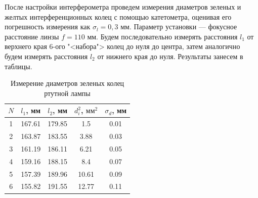 \documentclass[a4paper, 12pt]{article}%
\begin{document}
\item После настройки интерферометра проведем измерения диаметров зеленых и желтых интерференционных колец с помощью катетометра, оценивая его погрешность измерения как $ \sigma_l = 0,3 $ мм. Параметр установки --- фокусное расстояние линзы $ f = 110 $ мм. Будем последовательно измерять расстояния $ l_1 $ от верхнего края 6-ого "<набора"> колец до нуля до центра, затем аналогично будем измерять расстояния $ l_2 $ от нижнего края до нуля. Результаты занесем в таблицы. 

			\begin{table}[h!]
			\caption{Измерение диаметров зеленых колец ртутной лампы}
			\begin{center}
				\begin{tabular}{|c|c|c|c|c|}
					\hline
					$ N $ & $ l_1 $, мм & $ l_2 $, мм & $ d_i^2 $, $ мм^2 $ & $ \sigma_d $, мм\\
					\hline
					 1 & 167.61 & 179.85 & 1.5 & 0.01 \\
					2 & 163.87 & 183.55 & 3.88 & 0.03 \\
					3 & 161.19 & 186.11 & 6.21 & 0.05 \\
					4 & 159.16 & 188.15 & 8.4 & 0.07 \\
					5 & 157.39 & 189.96 & 10.61 & 0.09 \\
					6 & 155.82 & 191.55 & 12.77 & 0.11 \\
					\hline
				\end{tabular}
			\end{center}
			\label{table}
		\end{table}
	
\end{document}
